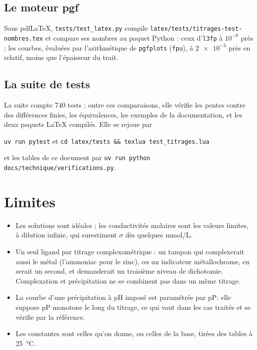\documentclass[a4paper,11pt]{article}
\newcommand\pP{\ensuremath{\mathrm{pP}}\xspace}
\newcommand\code[1]{\texttt{#1}}
\begin{document}
\subsection{Le moteur pgf}
Sous pdf\LaTeX, \code{tests/test\_latex.py} compile \code{latex/tests/titrages-test-nombres.tex} et compare ses nombres au paquet Python : ceux d'\code{l3fp} à $10^{-9}$ près ; les courbes, évaluées par l'arithmétique de \code{pgfplots} (\code{fpu}), à $\num{2e-3}$ près en relatif, moins que l'épaisseur du trait.

\subsection{La suite de tests}
La suite compte 740 tests ; outre ces comparaisons, elle vérifie les pentes contre des différences finies, les équivalences, les exemples de la documentation, et les deux paquets \LaTeX{} compilés.
Elle se rejoue par
\begin{center}
\code{uv run pytest} \quad et \quad \code{cd latex/tests \&\& texlua test\_titrages.lua}
\end{center}
et les tables de ce document par \code{uv run python docs/technique/verifications.py}.

\section{Limites}

\begin{itemize}
\item Les solutions sont idéales ; les conductivités molaires sont les valeurs limites, à dilution infinie, qui surestiment $\sigma$ dès quelques \unit{mmol/L}.
\item Un seul ligand par titrage complexométrique : un tampon qui complexerait aussi le métal (l'ammoniac pour le zinc), ou un indicateur métallochrome, en serait un second, et demanderait un troisième niveau de dichotomie.
Complexation et précipitation ne se combinent pas dans un même titrage.
\item La courbe d'une précipitation à pH imposé est paramétrée par \pP : elle suppose \pP monotone le long du titrage, ce qui vaut dans les cas traités et se vérifie par la référence.
\item Les constantes sont celles qu'on donne, ou celles de la base, tirées des tables à \qty{25}{\degreeCelsius}.
\end{itemize}
\end{document}

